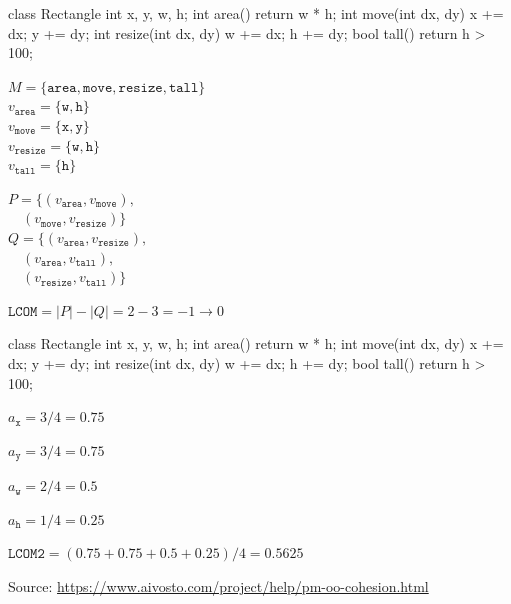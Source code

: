 \documentclass{article}
\begin{document}
\begin{multicols}{2}
{\small\begin{ffcode}
class Rectangle {
  int x, y, w, h;
  int area() {
    return w * h; }
  int move(int dx, dy) {
    x += dx; y += dy; }
  int resize(int dx, dy) {
    w += dx; h += dy; }
  bool tall() {
    return h > 100; }
}
\end{ffcode}
}
\par\columnbreak\par
{\small\( M = \{ \texttt{area}, \texttt{move}, \texttt{resize}, \texttt{tall} \} \) \\
\( v_\texttt{area} = \{ \texttt{w}, \texttt{h} \} \) \\
\( v_\texttt{move} = \{ \texttt{x}, \texttt{y} \} \) \\
\( v_\texttt{resize} = \{ \texttt{w}, \texttt{h} \} \) \\
\( v_\texttt{tall} = \{ \texttt{h} \} \) \par
\( P = \{ (v_\texttt{area}, v_\texttt{move}), \) \\
\( \quad (v_\texttt{move}, v_\texttt{resize}) \} \) \\
\( Q = \{ (v_\texttt{area}, v_\texttt{resize}), \) \\
\( \quad (v_\texttt{area}, v_\texttt{tall}), \) \\
\( \quad (v_\texttt{resize}, v_\texttt{tall}) \} \) \par
\( \texttt{LCOM} = |P| - |Q| = 2 - 3 = -1 \to 0\) \\}
\end{multicols}
\plush{}


\begin{multicols}{2}
{\small\begin{ffcode}
class Rectangle {
  int x, y, w, h;
  int area() {
    return w * h; }
  int move(int dx, dy) {
    x += dx; y += dy; }
  int resize(int dx, dy) {
    w += dx; h += dy; }
  bool tall() {
    return h > 100; }
}
\end{ffcode}
}
\par\columnbreak\par
\( a_\texttt{x} = 3 / 4 = 0.75 \) \par
\( a_\texttt{y} = 3 / 4 = 0.75 \) \par
\( a_\texttt{w} = 2 / 4 = 0.5 \) \par
\( a_\texttt{h} = 1 / 4 = 0.25 \) \par
\( \texttt{LCOM2} = (0.75 + 0.75 + 0.5 + 0.25) / 4 = 0.5625 \) \par
{\scriptsize Source: \url{https://www.aivosto.com/project/help/pm-oo-cohesion.html}\par}
\end{multicols}
\plush{}
\end{document}
